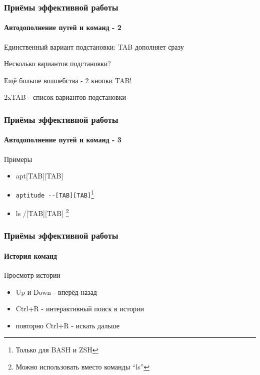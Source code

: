 \begin{frame}
  \frametitle{Приёмы эффективной работы}
  \framesubtitle{Автодополнение путей и команд - 2}
  
  \Large{\alert{Единственный вариант подстановки}: \newline TAB дополняет сразу} \pause

  \Large{\alert{Несколько вариантов подстановки?}} 

  \Large{Ещё больше волшебства - 2 кнопки TAB!} 

  \Large{\alert{2xTAB - список вариантов подстановки}}
\end{frame}

\begin{frame}[fragile]
  \frametitle{Приёмы эффективной работы}
  \framesubtitle{Автодополнение путей и команд - 3}
  
  \Huge{Примеры}

  \Large{
  \begin{itemize}
    \item apt[TAB][TAB]
    \item \verb+aptitude --[TAB][TAB]+\footnote{Только для BASH и ZSH}
    \item ls /[TAB][TAB] \footnote{Можно использовать вместо команды ``ls''}
  \end{itemize}
      }
\end{frame}
  

\begin{frame}
  \frametitle{Приёмы эффективной работы}
  \framesubtitle{История команд}

  \Large{\alert{Просмотр истории}}

  \begin{itemize}
    \item \textquotedbl Up \textquotedbl и \textquotedbl Down \textquotedbl - вперёд-назад \pause
    \item \textquotedbl Ctrl+R \textquotedbl - интерактивный поиск в истории \pause
    \item повторно \textquotedbl Ctrl+R \textquotedbl - искать дальше
  \end{itemize}
\end{frame}

